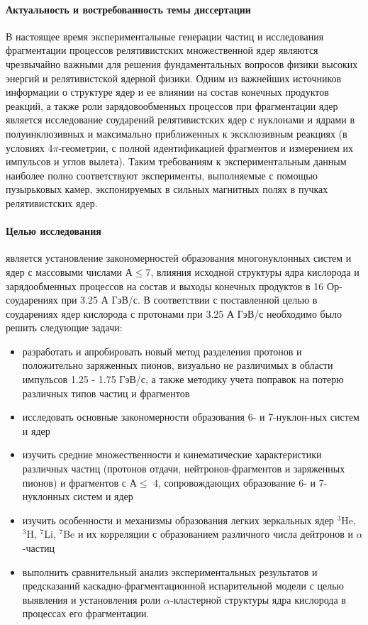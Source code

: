 \documentclass[fontsize=14pt]{scrarticle}
\begin{document}
\paragraph{Актуальность и востребованность темы диссертации} В настоящее время экспериментальные генерации частиц и исследования
фрагментации процессов релятивистских множественной ядер являются
чрезвычайно важными для решения фундаментальных вопросов физики
высоких энергий и релятивистской ядерной физики. Одним из важнейших
источников информации о структуре ядер и ее влиянии на состав конечных продуктов реакций, а также роли зарядовообменных процессов при фрагментации ядер является исследование соударений релятивистских ядер с нуклонами и ядрами в полуинклюзивных и максимально приближенных к эксклюзивным реакциях (в условиях 4$\pi$-геометрии,
с полной идентификацией фрагментов и измерением их импульсов и углов вылета). Таким требованиям к экспериментальным данным наиболее полно соответствуют эксперименты, выполняемые с помощью пузырьковых камер, экспонируемых в сильных магнитных полях в пучках релятивистских ядер.
\paragraph{Целью исследования}  является установление закономерностей образования многонуклонных систем и ядер с массовыми числами А$\le$7,
влияния исходной структуры ядра кислорода и зарядообменных процессов на состав и выходы конечных продуктов в 16 Ор-соударениях при 3.25 А ГэВ/с. В соответствии с поставленной целью в соударениях ядер кислорода с протонами при 3.25 А ГэВ/с необходимо было решить следующие задачи:
\begin{itemize}
    \item разработать и апробировать новый метод разделения протонов и положительно заряженных пионов, визуально не различимых в области импульсов 1.25 - 1.75 ГэВ/с, а также методику учета поправок на потерю различных типов частиц и фрагментов
    \item исследовать основные закономерности образования 6- и 7-нуклон-ных систем и ядер
    \item изучить средние множественности и кинематические характеристики различных частиц (протонов отдачи, нейтронов-фрагментов и заряженных пионов) и фрагментов с А$\le$ 4, сопровождающих образование 6- и 7- нуклонных систем и ядер
    \item изучить особенности и механизмы образования легких зеркальных ядер $^{3}$He, $^{3}$H, $^{7}$Li, $^{7}$Be и их корреляции с образованием различного числа дейтронов и $\alpha$-частиц
    \item выполнить сравнительный анализ экспериментальных результатов и предсказаний каскадно-фрагментационной испарительной модели с целью выявления и установления роли $\alpha$-кластерной структуры ядра кислорода в процессах его фрагментации.
\end{itemize}
\end{document}
